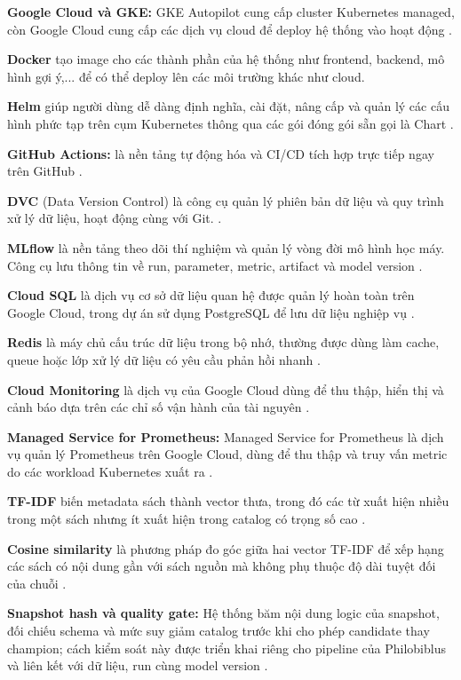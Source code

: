 \textbf{Google Cloud và GKE:} GKE Autopilot cung cấp cluster Kubernetes managed, còn Google Cloud cung cấp các dịch vụ cloud để deploy hệ thống vào hoạt động \cite{gke-autopilot}.

\textbf{Docker} tạo image cho các thành phần của hệ thống như frontend, backend, mô hình gợi ý,... để có thể deploy lên các môi trường khác như cloud.

\textbf{Helm} giúp người dùng dễ dàng định nghĩa, cài đặt, nâng cấp và quản lý các cấu hình phức tạp trên cụm Kubernetes thông qua các gói đóng gói sẵn gọi là Chart \cite{helm-charts}.

\textbf{GitHub Actions:} là nền tảng tự động hóa và CI/CD tích hợp trực tiếp ngay trên GitHub \cite{github-actions}.

\textbf{DVC} (Data Version Control) là công cụ quản lý phiên bản dữ liệu và quy trình xử lý dữ liệu, hoạt động cùng với Git. \cite{dvc}.

\textbf{MLflow} là nền tảng theo dõi thí nghiệm và quản lý vòng đời mô hình học máy. Công cụ lưu thông tin về run, parameter, metric, artifact và model version \cite{mlflow}.

\textbf{Cloud SQL} là dịch vụ cơ sở dữ liệu quan hệ được quản lý hoàn toàn trên Google Cloud, trong dự án sử dụng PostgreSQL để lưu dữ liệu nghiệp vụ \cite{cloud-sql}.

\textbf{Redis} là máy chủ cấu trúc dữ liệu trong bộ nhớ, thường được dùng làm cache, queue hoặc lớp xử lý dữ liệu có yêu cầu phản hồi nhanh \cite{redis-datatypes}.

\textbf{Cloud Monitoring} là dịch vụ của Google Cloud dùng để thu thập, hiển thị và cảnh báo dựa trên các chỉ số vận hành của tài nguyên \cite{cloud-monitoring}.

\textbf{Managed Service for Prometheus:} Managed Service for Prometheus là dịch vụ quản lý Prometheus trên Google Cloud, dùng để thu thập và truy vấn metric do các workload Kubernetes xuất ra \cite{prometheus,managed-prometheus}.

\textbf{TF-IDF} biến metadata sách thành vector thưa, trong đó các từ xuất hiện nhiều trong một sách nhưng ít xuất hiện trong catalog có trọng số cao \cite{sklearn}.

\textbf{Cosine similarity} là phương pháp đo góc giữa hai vector TF-IDF để xếp hạng các sách có nội dung gần với sách nguồn mà không phụ thuộc độ dài tuyệt đối của chuỗi \cite{sklearn}.

\textbf{Snapshot hash và quality gate:} Hệ thống băm nội dung logic của snapshot, đối chiếu schema và mức suy giảm catalog trước khi cho phép candidate thay champion; cách kiểm soát này được triển khai riêng cho pipeline của Philobiblus và liên kết với dữ liệu, run cùng model version \cite{dvc,mlflow}.

